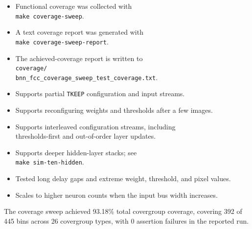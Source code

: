 \begin{itemize}
  \item Functional coverage was collected with\\
  \hspace*{1.5em}\texttt{make coverage-sweep}.
  \item A text coverage report was generated with\\
  \hspace*{1.5em}\texttt{make coverage-sweep-report}.
  \item The achieved-coverage report is written to\\
  \hspace*{1.5em}\texttt{coverage/}\\
  \hspace*{1.5em}\texttt{bnn\_fcc\_coverage\_sweep\_test\_coverage.txt}.
  \item Supports partial \texttt{TKEEP} configuration and input streams.
  \item Supports reconfiguring weights and thresholds after a few images.
  \item Supports interleaved configuration streams, including\\
  \hspace*{1.5em}thresholds-first and out-of-order layer updates.
  \item Supports deeper hidden-layer stacks; see\\
  \hspace*{1.5em}\texttt{make sim-ten-hidden}.
  \item Tested long delay gaps and extreme weight, threshold, and pixel values.
  \item Scales to higher neuron counts when the input bus width increases.
\end{itemize}

The coverage sweep achieved 93.18\% total covergroup coverage, covering
392 of 445 bins across 26 covergroup types, with 0 assertion failures in the
reported run.

